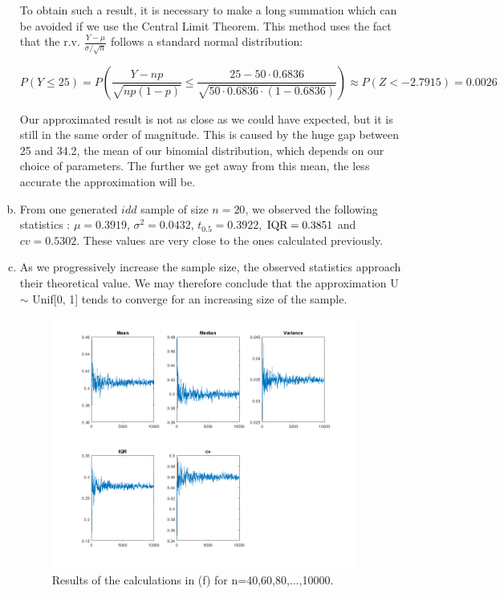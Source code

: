 \documentclass[a4paper]{article}
\begin{document}
\begin{enumerate}[(a)]
To obtain such a result, it is necessary to make a long summation which can be avoided if we use the Central Limit Theorem. This method uses the fact that the r.v. $\frac{Y-\mu}{\sigma / \sqrt{n}}$ follows a standard normal distribution:

$$P(Y \leq 25) = P\left ( \frac{Y-np}{\sqrt{np(1-p)}} \leq \frac{25-50\cdot0.6836}{\sqrt{50\cdot0.6836\cdot(1-0.6836)}} \right ) \approx P(Z < -2.7915) = 0.0026$$

Our approximated result is not as close as we could have expected, but it is still in the same order of magnitude. This is caused by the huge gap between 25 and 34.2, the mean of our binomial distribution, which depends on our choice of parameters. The further we get away from this mean, the less accurate the approximation will be.

\item From one generated $idd$ sample of size $n = 20$, we observed the following statistics : $\mu = 0.3919$, $\sigma^2 = 0.0432$, $t_0.5 = 0.3922$, $\textup{IQR} = 0.3851$ and $cv = 0.5302$.
These values are very close to the ones calculated previously.

\item As we progressively increase the sample size, the observed statistics approach their theoretical value. We may therefore conclude that the approximation U $\sim$ Unif[0, 1] tends to converge for an increasing size of the sample.

\begin{figure}
    \centering
  \includegraphics[width = 10cm]{img/values.png}
  \caption{Results of the calculations in (f) for n=40,60,80,...,10000.}
\end{figure}

\end{enumerate}
\end{document}
